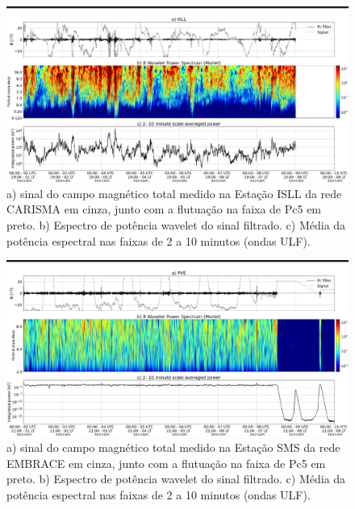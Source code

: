 \documentclass[11pt, oneside]{article}
\begin{document}
\begin{figure}[H]
    
                        \centering
   
                             \includegraphics[width=14cm]{./figures//figureULF_0.png}

                             \caption{a) sinal do campo magnético total 
                              medido na Estação ISLL da rede CARISMA em cinza, 
                              junto com a flutuação na faixa de Pc5 em preto. b) 
                              Espectro de potência wavelet do sinal filtrado. c) 
                              Média da potência espectral nas faixas de 2 a 10 minutos 
                              (ondas ULF).}
                        \end{figure}

                     \begin{figure}[H]
    
                        \centering
   
                             \includegraphics[width=14cm]{./figures//figureULF_1.png}

                             \caption{a) sinal do campo magnético total medido 
                              na Estação SMS da rede EMBRACE em cinza, junto com a 
                              flutuação na faixa de Pc5 em preto. b) Espectro de potência 
                              wavelet do sinal filtrado. c) Média da potência espectral nas 
                              faixas de 2 a 10 minutos (ondas ULF).}
                        \end{figure}
\end{document}
